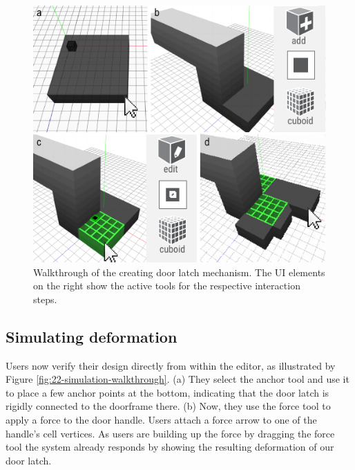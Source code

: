 \begin{figure} [h]
    \includegraphics[width=\textwidth]{chapters/metamaterial-mechanisms-FIG/21-editor-walkthrough.pdf}
    \caption[Short figure name.]{Walkthrough of the creating door latch mechanism. The UI elements on the right show the active tools for the respective interaction steps.
    \label{fig:21-editor-walkthrough}}
\end{figure}

\subsection{Simulating deformation}

Users now verify their design directly from within the editor, as illustrated by Figure \ref{fig:22-simulation-walkthrough}. (a) They select the anchor tool and use it to place a few anchor points at the bottom, indicating that the door latch is rigidly connected to the doorframe there. (b) Now, they use the force tool to apply a force to the door handle. Users attach a force arrow to one of the handle’s cell vertices. As users are building up the force by dragging the force tool the system already responds by showing the resulting deformation of our door latch. 

